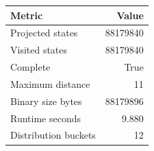{\small
\begin{tabular}{lr}
\hline
Metric & Value \\
\hline
Projected states & 88179840 \\
Visited states & 88179840 \\
Complete & True \\
Maximum distance & 11 \\
Binary size bytes & 88179896 \\
Runtime seconds & 9.880 \\
Distribution buckets & 12 \\
\hline
\end{tabular}
}
